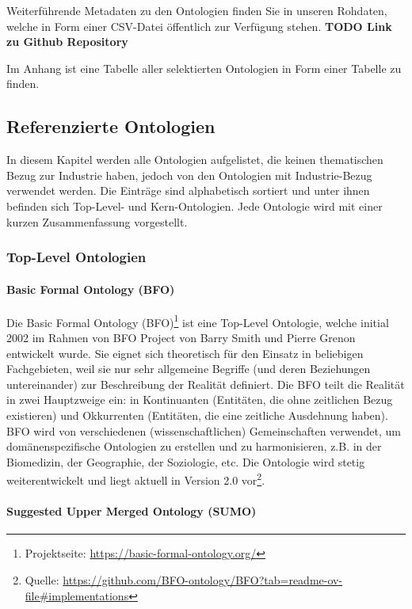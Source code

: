 \documentclass{article}
\begin{document}



Weiterführende Metadaten zu den Ontologien finden Sie in unseren Rohdaten, welche in Form einer CSV-Datei öffentlich zur Verfügung stehen. \textbf{TODO Link zu Github Repository}

Im Anhang ist eine Tabelle aller selektierten Ontologien in Form einer Tabelle zu finden.

\subsection{Referenzierte Ontologien}

In diesem Kapitel werden alle Ontologien aufgelistet, die keinen thematischen Bezug zur Industrie haben, jedoch von den Ontologien mit Industrie-Bezug verwendet werden.
Die Einträge sind alphabetisch sortiert und unter ihnen befinden sich Top-Level- und Kern-Ontologien.
Jede Ontologie wird mit einer kurzen Zusammenfassung vorgestellt.

\subsubsection{Top-Level Ontologien}

\paragraph{Basic Formal Ontology (BFO)} Die Basic Formal Ontology (BFO)\footnote{Projektseite: \url{https://basic-formal-ontology.org/}} ist eine Top-Level Ontologie, welche initial 2002 im Rahmen von BFO Project von Barry Smith und Pierre Grenon entwickelt wurde.
Sie eignet sich theoretisch für den Einsatz in beliebigen Fachgebieten, weil sie nur sehr allgemeine Begriffe (und deren Beziehungen untereinander) zur Beschreibung der Realität definiert.
Die BFO teilt die Realität in zwei Hauptzweige ein: in Kontinuanten (Entitäten, die ohne zeitlichen Bezug existieren) und Okkurrenten (Entitäten, die eine zeitliche Ausdehnung haben).
BFO wird von verschiedenen (wissenschaftlichen) Gemeinschaften verwendet, um domänenspezifische Ontologien zu erstellen und zu harmonisieren, z.B. in der Biomedizin, der Geographie, der Soziologie, etc.
Die Ontologie wird stetig weiterentwickelt und liegt aktuell in Version 2.0 vor\footnote{Quelle: \url{https://github.com/BFO-ontology/BFO?tab=readme-ov-file\#implementations}}.

\paragraph{Suggested Upper Merged Ontology (SUMO)}
\end{document}
